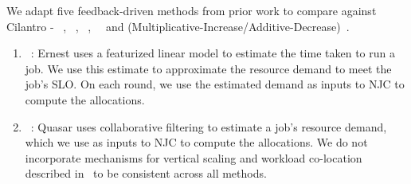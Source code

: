 We adapt five feedback-driven methods from prior work to compare against Cilantro - \ernest~\cite{venkataraman2016ernest},
\quasar~\cite{delimitrou2014quasar},  \minerva~\cite{nathan2019end},
\parties~\cite{chen2019parties}~and \AIMD{}
(Multiplicative-Increase/Additive-Decrease)~\cite{chiu1989analysis}.

\begin{enumerate}[label=\arabic*)]

    \item \ernest~\cite{venkataraman2016ernest}:
    Ernest uses a featurized linear model  to estimate the
    time taken to run a job.
    We use this estimate to approximate the resource demand to meet the job's SLO.
    On each round, we use the estimated demand as inputs to NJC to compute the allocations.
    \vspace{-0.05in}
    
    \item \quasar~\cite{delimitrou2014quasar}:
    Quasar uses collaborative filtering to estimate a job's resource demand, which we
    use as inputs to NJC to compute the allocations.
    We do not incorporate mechanisms for vertical scaling and workload co-location described
    in~\cite{delimitrou2014quasar} to be consistent across all methods.
    \vspace{-0.05in}
    

\end{enumerate}
